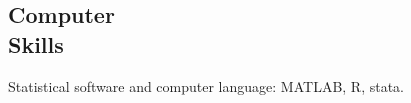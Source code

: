 \documentclass[margin,line]{res}
\newenvironment{list1}{
  \begin{list}{\ding{113}}{%
      \setlength{\itemsep}{0in}
      \setlength{\parsep}{0in} \setlength{\parskip}{0in}
      \setlength{\topsep}{0in} \setlength{\partopsep}{0in} 
      \setlength{\leftmargin}{0.17in}}}{\end{list}}
\begin{document}
\begin{resume}
\section{\sc Computer \\ Skills} 
Statistical software and computer language: MATLAB, R, stata.\\
%


\end{resume}
\end{document}
